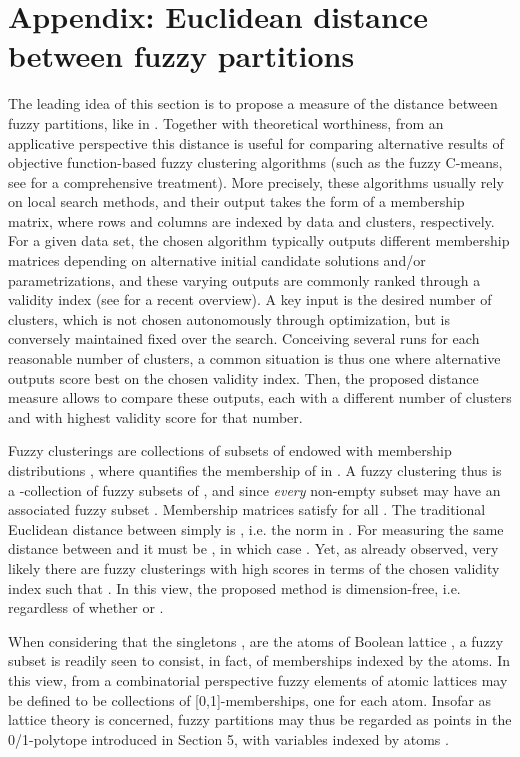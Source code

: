 \documentclass[a4paper,10pt]{article}
\begin{document}
\section{Appendix: Euclidean distance between fuzzy partitions}
The leading idea of this section is to propose a measure of the distance between fuzzy partitions, like in \cite{Brouwer2009}. Together with theoretical worthiness, from an applicative
perspective this distance is useful for comparing alternative results of objective function-based fuzzy clustering algorithms (such as the fuzzy
C-means, see \cite{FuzzyCmeansBook2008,Valente+07} for a comprehensive treatment). More precisely, these algorithms usually rely on local search methods, and their output takes the
form of a membership matrix, where rows and columns are indexed by data and clusters, respectively. For a given data set, the chosen algorithm typically outputs different membership
matrices depending on alternative initial candidate solutions and/or parametrizations, and these varying outputs are commonly ranked through a validity index
(see \cite{WangZhang2007} for a recent overview). A key input is the desired number of clusters, which is not chosen autonomously through optimization, but is conversely maintained
fixed over the search. Conceiving several runs for each reasonable number of clusters, a common situation is thus one where alternative outputs score best on the chosen validity index.
Then, the proposed distance measure allows to compare these outputs, each with a different number of clusters and with highest validity score for that number.

Fuzzy clusterings are collections  of subsets of  endowed with  membership distributions , where 
quantifies the membership of  in . A fuzzy clustering thus is a -collection of fuzzy subsets  of 
\cite{FuzzySubset}, and  since \textit{every} non-empty subset  may have an associated fuzzy subset .
Membership matrices  satisfy  for all . The traditional Euclidean distance  between
 simply is , i.e. the  norm in . For measuring the
same distance  between  and  it must be , in which case
. Yet, as already observed, very likely there are fuzzy clusterings with high scores
in terms of the chosen validity index such that . In this view, the proposed method is dimension-free, i.e. regardless of whether  or .

When considering that the  singletons , 
are the atoms of Boolean lattice , a fuzzy subset is readily seen to consist, in fact, of  memberships  indexed by the  atoms. In
this view, from a combinatorial
perspective fuzzy elements of atomic lattices may be defined to be collections of [0,1]-memberships, one for each atom. Insofar as lattice theory is concerned, fuzzy partitions may thus be
regarded as points in the 0/1-polytope  introduced in Section 5, with variables 
indexed by atoms .
\end{document}
